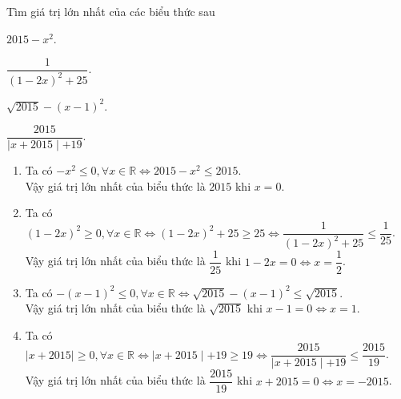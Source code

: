 \begin{bt}%
	Tìm giá trị lớn nhất của các biểu thức sau
	\begin{listEX}[2]
		\item $2015-x^{2}$.
		\item $\dfrac{1}{(1-2x)^{2}+25}$.
		\item $\sqrt{2015} - (x-1)^{2}$.
		\item $\dfrac{2015}{\mid x+2015 \mid +19}$.
	\end{listEX}
	\loigiai
	{
		\begin{enumerate}
			\item Ta có $-x^{2} \leq 0, \forall x \in \mathbb{R} \Leftrightarrow 2015 -x^{2} \leq 2015$. \\
			Vậy giá trị lớn nhất của biểu thức là $2015$ khi $x=0$.
			
			\item Ta có $(1-2x)^{2} \geq 0, \forall x \in \mathbb{R} \Leftrightarrow (1-2x)^{2}+25 \geq 25 \Leftrightarrow \dfrac{1}{(1-2x)^{2}+25} \leq \dfrac{1}{25}$. \\
			Vậy giá trị lớn nhất của biểu thức là $\dfrac{1}{25}$ khi $1-2x=0 \Leftrightarrow x= \dfrac{1}{2}$.
			
			\item Ta có $-(x-1)^{2} \leq 0, \forall x \in \mathbb{R} \Leftrightarrow \sqrt{2015} -(x-1)^{2} \leq \sqrt{2015}$. \\
			Vậy giá trị lớn nhất của biểu thức là $\sqrt{2015}$ khi $x-1=0 \Leftrightarrow x=1$.
			
			\item Ta có $\mid x+2015 \mid \geq 0, \forall x \in \mathbb{R} \Leftrightarrow \mid x+2015 \mid +19 \geq 19 \Leftrightarrow \dfrac{2015}{\mid x+2015 \mid +19} \leq \dfrac{2015}{19}$. \\
			Vậy giá trị lớn nhất của biểu thức là $\dfrac{2015}{19}$ khi $x+2015=0 \Leftrightarrow x=-2015$.
		\end{enumerate}
	}
\end{bt}

